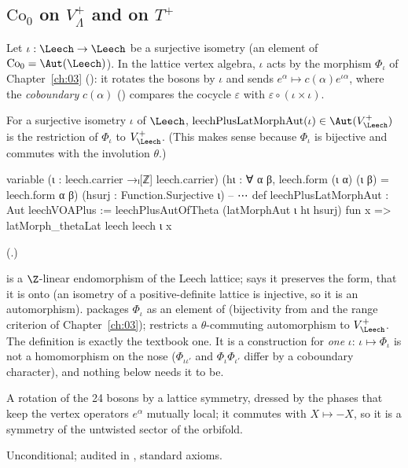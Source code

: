 \subsection{\texorpdfstring{$\mathrm{Co}_0$}{Co0} on \texorpdfstring{$V_\Lambda^+$}{V\_Lambda+} and on \texorpdfstring{$T^+$}{T+}}

Let $\iota:\Leech\to\Leech$ be a surjective isometry (an element of $\chtwentytwoCo_0=\Aut(\Leech)$).  In the lattice
vertex algebra, $\iota$ acts by the morphism $\Phi_\iota$ of Chapter~\ref{ch:03} (): it rotates the
bosons by $\iota$ and sends $e^\alpha\mapsto c(\alpha)e^{\iota\alpha}$, where the \emph{coboundary}
$c(\alpha)$ () compares the cocycle $\varepsilon$ with $\varepsilon\circ(\iota\times\iota)$.

\begin{definition}\label{ch22:def:latplus}
For a surjective isometry $\iota$ of $\Leech$, $\mathrm{leechPlusLatMorphAut}(\iota)\in\Aut(V_\Leech^+)$ is the restriction of
$\Phi_\iota$ to $V_\Leech^+$.  (This makes sense because $\Phi_\iota$ is bijective and commutes with the involution
$\theta$.)
\end{definition}
\begin{leancode}
variable (ι : leech.carrier →ₗ[ℤ] leech.carrier)
  (hι : ∀ α β, leech.form (ι α) (ι β) = leech.form α β) (hsurj : Function.Surjective ι)
-- ⋯
def leechPlusLatMorphAut : Aut leechVOAPlus :=
  leechPlusAutOfTheta (latMorphAut ι hι hsurj) fun x => latMorph_thetaLat leech leech ι x
\end{leancode}
(.)
\begin{dictionary}
 is a $\Z$-linear endomorphism of the Leech lattice;  says it
preserves the form,  that it is onto (an isometry of a positive-definite lattice is injective, so it is an
automorphism).   packages $\Phi_\iota$ as an element of  (bijectivity from
 and the range criterion  of Chapter~\ref{ch:03});
 restricts a $\theta$-commuting automorphism to $V_\Leech^+$.  The definition is exactly the
textbook one.  It is a construction for \emph{one} $\iota$: $\iota\mapsto\Phi_\iota$ is not a homomorphism on the nose
($\Phi_{\iota\iota'}$ and $\Phi_\iota\Phi_{\iota'}$ differ by a coboundary character), and nothing below needs it to
be.
\end{dictionary}
\begin{physics}
A rotation of the 24 bosons by a lattice symmetry, dressed by the phases that keep the vertex operators $e^\alpha$
mutually local; it commutes with $X\mapsto-X$, so it is a symmetry of the untwisted sector of the orbifold.
\end{physics}
\begin{status}Unconditional; audited in , standard axioms.\end{status}

